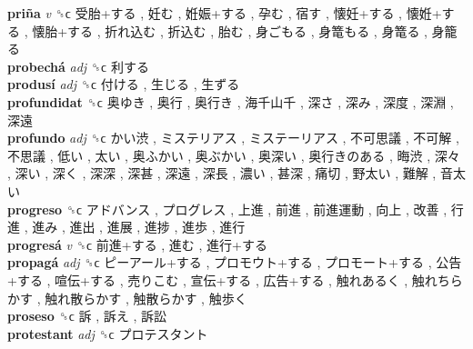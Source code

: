 \textbf{priña} \emph{v}  ␝ϲ   受胎+する ,  妊む ,  姙娠+する ,  孕む ,  宿す ,  懐妊+する ,  懐姙+する ,  懐胎+する ,  折れ込む ,  折込む ,  胎む ,  身ごもる ,  身篭もる ,  身篭る ,  身籠る   \\
\textbf{probechá} \emph{adj}  ␝ϲ   利する   \\
\textbf{produsí} \emph{adj}  ␝ϲ   付ける ,  生じる ,  生ずる   \\
\textbf{profundidat} ␝ϲ   奥ゆき ,  奥行 ,  奥行き ,  海千山千 ,  深さ ,  深み ,  深度 ,  深淵 ,  深遠   \\
\textbf{profundo} \emph{adj}  ␝ϲ   かい渋 ,  ミステリアス ,  ミステーリアス ,  不可思議 ,  不可解 ,  不思議 ,  低い ,  太い ,  奥ふかい ,  奥ぶかい ,  奥深い ,  奥行きのある ,  晦渋 ,  深々 ,  深い ,  深く ,  深深 ,  深甚 ,  深遠 ,  深長 ,  濃い ,  甚深 ,  痛切 ,  野太い ,  難解 ,  音太い   \\
\textbf{progreso} ␝ϲ   アドバンス ,  プログレス ,  上進 ,  前進 ,  前進運動 ,  向上 ,  改善 ,  行進 ,  進み ,  進出 ,  進展 ,  進捗 ,  進歩 ,  進行   \\
\textbf{progresá} \emph{v}  ␝ϲ   前進+する ,  進む ,  進行+する   \\
\textbf{propagá} \emph{adj}  ␝ϲ   ピーアール+する ,  プロモウト+する ,  プロモート+する ,  公告+する ,  喧伝+する ,  売りこむ ,  宣伝+する ,  広告+する ,  触れあるく ,  触れちらかす ,  触れ散らかす ,  触散らかす ,  触歩く   \\
\textbf{proseso} ␝ϲ   訴 ,  訴え ,  訴訟   \\
\textbf{protestant} \emph{adj}  ␝ϲ   プロテスタント   \\
